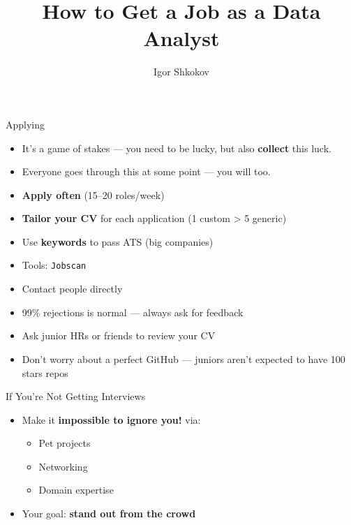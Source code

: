 \documentclass[10pt,a4paper]{article}
\date{} %
\title{How to Get a Job as a \textbf{Data Analyst}}
\author{Igor Shkokov}
\begin{document}
\small
\begin{multicols}{3}

\maketitle
\thispagestyle{empty}
\scriptsize
	
\begin{textbox}{Applying}

\begin{itemize}
    \item It's a game of stakes — you need to be lucky, but also \textbf{collect} this luck.
    \item Everyone goes through this at some point — you will too.
    \item \textbf{Apply often} (15–20 roles/week)
    \item \textbf{Tailor your CV} for each application (1 custom > 5 generic)
    \item Use \textbf{keywords} to pass ATS (big companies)
    \item Tools: \texttt{Jobscan}
    \item Contact people directly
    \item 99\% rejections is normal — always ask for feedback
    \item Ask junior HRs or friends to review your CV
    \item Don't worry about a perfect GitHub — juniors aren’t expected to have 100 stars repos
\end{itemize}

\end{textbox}

\begin{textboxGreen}{If You're Not Getting Interviews}
\begin{itemize}
    \item Make it \textbf{impossible to ignore you!} via:
    \begin{itemize}
        \item Pet projects
        \item Networking
        \item Domain expertise
    \end{itemize}
    \item Your goal: \textbf{stand out from the crowd}
\end{itemize}
\end{textboxGreen}


\end{multicols}
\end{document}
